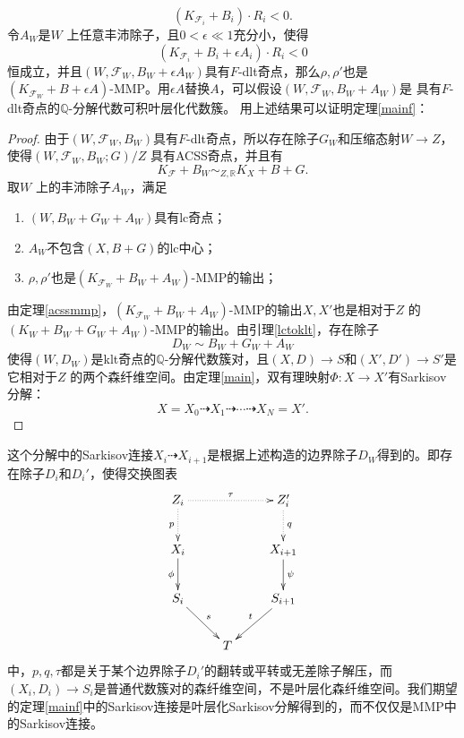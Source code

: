 \[ (K_{\mathcal{F}_{i}}+B_{i})\cdot R_{i}<0 .\]
令$A_{W}$是$W$ 上任意丰沛除子，且$0<\epsilon\ll 1$充分小，使得
\[ (K_{\mathcal{F}_{i}}+B_{i}+\epsilon A_{i})\cdot R_{i}<0 \]
恒成立，并且$(W,\mathcal{F}_{W},B_{W}+\epsilon A_{W})$具有$F$-dlt奇点，那么$\rho,\rho'$也是$(K_{\mathcal{F}_{W}}+B+\epsilon A)$-MMP。用$\epsilon A$替换$A$，可以假设$(W,\mathcal{F}_{W},B_{W}+A_{W})$是 具有$F$-dlt奇点的$\mathbb{Q}$-分解代数可积叶层化代数簇。 
用上述结果可以证明定理\ref{mainf}：
\begin{proof}
  由于$(W,\mathcal{F}_{W},B_{W})$具有$F$-dlt奇点，所以存在除子$G_{W}$和压缩态射$W\to Z$，使得$(W,\mathcal{F}_{W},B_{W};G)/Z$ 具有ACSS奇点，并且有
  \[ K_{\mathcal{F}}+B_{W} \sim_{Z,\mathbb{R}} K_{X}+B+G. \]
 取$W$ 上的丰沛除子$A_{W}$，满足
 \begin{enumerate}
   \item $(W,B_{W}+G_{W}+A_{W}) $具有lc奇点；
   \item $A_{W}$不包含$(X,B+G)$的lc中心；
   \item $\rho,\rho' $也是$(K_{\mathcal{F}_{W}}+B_{W}+A_{W})$-MMP的输出；
 \end{enumerate}
 由定理\ref{acssmmp}，$(K_{\mathcal{F}_{W}}+B_{W}+A_{W})$-MMP的输出$X,X'$也是相对于$Z$ 的$(K_{W}+B_{W}+G_{W}+A_{W})$-MMP的输出。由引理\ref{lctoklt}，存在除子
\[ D_{W}\sim B_{W}+G_{W}+A_{W} \]
使得$(W,D_{W})$是klt奇点的$\mathbb{Q}$-分解代数簇对，且$(X,D)\to S $和$(X',D')\to S' $是它相对于$Z$ 的两个森纤维空间。由定理\ref{main}，双有理映射$\Phi:X\to X'$有Sarkisov分解：
\[ X=X_{0}\dashrightarrow X_{1}\dashrightarrow \cdots \dashrightarrow X_{N}=X' .\] \end{proof}

\begin{remark}
 这个分解中的Sarkisov连接$X_{i}\dashrightarrow X_{i+1}$是根据上述构造的边界除子$D_{W}$得到的。即存在除子$D_{i}$和$D_{i}'$，使得交换图表
  \[ \xymatrix{
      Z_{i}\ar@{.>}[d]_p\ar@{.>}[rr]^{\tau}&&Z_{i}'\ar@{.>}[d]^q\\
      X_{i}\ar[d]_{\phi}&&X_{i+1}\ar[d]^\psi\\
      S_{i}\ar[rd]^s&&S_{i+1}\ar[ld]_t\\
      &T&} \]
      中，$p,q,\tau$都是关于某个边界除子$D_{i}'$的翻转或平转或无差除子解压，而$(X_{i},D_{i})\to S_{i}$是普通代数簇对的森纤维空间，不是叶层化森纤维空间。我们期望的定理\ref{mainf}中的Sarkisov连接是叶层化Sarkisov分解得到的，而不仅仅是MMP中的Sarkisov连接。
\end{remark}

